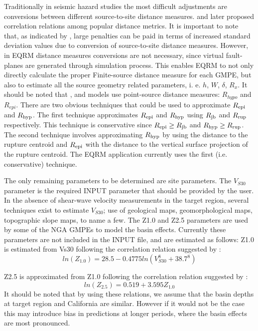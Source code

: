 Traditionally in seismic hazard studies the most difficult
adjustments are conversions between different source-to-site
distance measures. \citet{eqrm_Scherbaum04b} and later
\citet{eqrm_Kak11} proposed correlation relations among popular
distance metrics. It is important to note that, as indicated by
\citet{eqrm_Scherbaum05}, large penalties can be paid in terms of
increased standard deviation values due to conversion of
source-to-site distance measures. However, in EQRM distance measures
conversions are not necessary, since virtual fault-planes are
generated through simulation process. This enables EQRM to not only
directly calculate the proper Finite-source distance measure for
each GMPE, but also to estimate all the source geometry related
parameters, i. e. $h$, $W$, $\delta$, $R_x$. It should be noted that
\citet{eqrm_Gaull90a}, and \citet{eqrm_Liang08} models use
point-source distance measures: $R_{hypo}$ and $R_{epi}$. There are
two obvious techniques that could be used to approximate $\Repi$ and
$\Rhyp$. The first technique approximates $\Repi$ and $\Rhyp$ using
$\Rjb$ and $\Rrup$ respectively. This technique is conservative
since \mbox{$\Repi \geq \Rjb$} and \mbox{$\Rhyp \geq \Rrup$}. The
second technique involves approximating $\Rhyp$ by using the
distance to the rupture centroid and $\Repi$ with the distance to
the vertical surface projection of the rupture centroid. The EQRM
application currently uses the first (i.e. conservative) technique.

The only remaining parameters to be determined are site parameters.
The $V_{S30}$ parameter is the required INPUT parameter that should
be provided by the user. In the absence of shear-wave velocity
measurements in the target region, several techniques exist to
estimate $V_{S30}$; use of geological maps, geomorphological maps,
topographic slope maps, to name a few. The Z1.0 and Z2.5 parameters
are used by some of the NGA GMPEs to model the basin effects.
Currently these parameters are not included in the INPUT file, and
are estimated as follows: Z1.0 is estimated from Vs30 following the
correlation relation suggested by \citet{eqrm_Chiou08}:
\begin{equation}
ln(Z_{1.0}) = 28.5-0.4775ln(V_{S30}^8+38.7^8)
\end{equation}

Z2.5 is approximated from Z1.0 following the correlation relation
suggested by \citet{eqrm_Campbell07}:
\begin{equation}
ln(Z_{2.5}) = 0.519+3.595Z_{1.0}
\end{equation}
It should be noted that by using these relations, we assume that the
basin depths at target region and California are similar. However if
it would not be the case this may introduce bias in predictions at
longer periods, where the basin effects are most pronounced.

